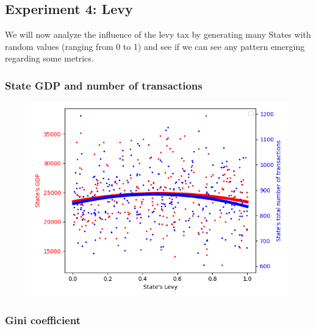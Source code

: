 {{{{    \subsection{Experiment 4: Levy}
    We will now analyze the influence of the levy tax by generating many States with random values (ranging from 0 to 1) and see if we can see any pattern emerging regarding some metrics. 

        \subsubsection{State GDP and number of transactions}

        \begin{figure}
            \includegraphics[width=\linewidth]{img/exp/4_1.png}
        \end{figure} 
        { \lipsum[1-2] %
        \par

        \subsubsection{Gini coefficient}

}}}}}
